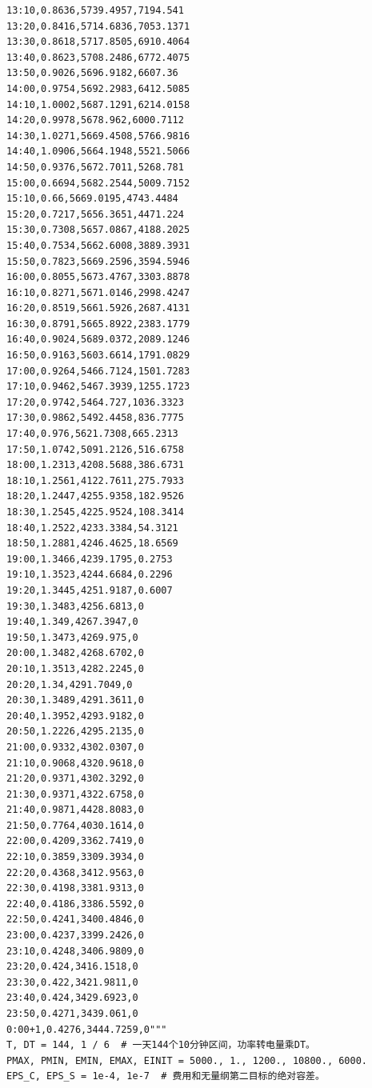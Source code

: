 \documentclass[withoutpreface,bwprint]{cumcmthesis}
\begin{document}
\begin{appendices}
\begin{lstlisting}
13:10,0.8636,5739.4957,7194.541
13:20,0.8416,5714.6836,7053.1371
13:30,0.8618,5717.8505,6910.4064
13:40,0.8623,5708.2486,6772.4075
13:50,0.9026,5696.9182,6607.36
14:00,0.9754,5692.2983,6412.5085
14:10,1.0002,5687.1291,6214.0158
14:20,0.9978,5678.962,6000.7112
14:30,1.0271,5669.4508,5766.9816
14:40,1.0906,5664.1948,5521.5066
14:50,0.9376,5672.7011,5268.781
15:00,0.6694,5682.2544,5009.7152
15:10,0.66,5669.0195,4743.4484
15:20,0.7217,5656.3651,4471.224
15:30,0.7308,5657.0867,4188.2025
15:40,0.7534,5662.6008,3889.3931
15:50,0.7823,5669.2596,3594.5946
16:00,0.8055,5673.4767,3303.8878
16:10,0.8271,5671.0146,2998.4247
16:20,0.8519,5661.5926,2687.4131
16:30,0.8791,5665.8922,2383.1779
16:40,0.9024,5689.0372,2089.1246
16:50,0.9163,5603.6614,1791.0829
17:00,0.9264,5466.7124,1501.7283
17:10,0.9462,5467.3939,1255.1723
17:20,0.9742,5464.727,1036.3323
17:30,0.9862,5492.4458,836.7775
17:40,0.976,5621.7308,665.2313
17:50,1.0742,5091.2126,516.6758
18:00,1.2313,4208.5688,386.6731
18:10,1.2561,4122.7611,275.7933
18:20,1.2447,4255.9358,182.9526
18:30,1.2545,4225.9524,108.3414
18:40,1.2522,4233.3384,54.3121
18:50,1.2881,4246.4625,18.6569
19:00,1.3466,4239.1795,0.2753
19:10,1.3523,4244.6684,0.2296
19:20,1.3445,4251.9187,0.6007
19:30,1.3483,4256.6813,0
19:40,1.349,4267.3947,0
19:50,1.3473,4269.975,0
20:00,1.3482,4268.6702,0
20:10,1.3513,4282.2245,0
20:20,1.34,4291.7049,0
20:30,1.3489,4291.3611,0
20:40,1.3952,4293.9182,0
20:50,1.2226,4295.2135,0
21:00,0.9332,4302.0307,0
21:10,0.9068,4320.9618,0
21:20,0.9371,4302.3292,0
21:30,0.9371,4322.6758,0
21:40,0.9871,4428.8083,0
21:50,0.7764,4030.1614,0
22:00,0.4209,3362.7419,0
22:10,0.3859,3309.3934,0
22:20,0.4368,3412.9563,0
22:30,0.4198,3381.9313,0
22:40,0.4186,3386.5592,0
22:50,0.4241,3400.4846,0
23:00,0.4237,3399.2426,0
23:10,0.4248,3406.9809,0
23:20,0.424,3416.1518,0
23:30,0.422,3421.9811,0
23:40,0.424,3429.6923,0
23:50,0.4271,3439.061,0
0:00+1,0.4276,3444.7259,0"""
T, DT = 144, 1 / 6  # 一天144个10分钟区间，功率转电量乘DT。
PMAX, PMIN, EMIN, EMAX, EINIT = 5000., 1., 1200., 10800., 6000.
EPS_C, EPS_S = 1e-4, 1e-7  # 费用和无量纲第二目标的绝对容差。



\end{lstlisting}
\end{appendices}
\end{document}
